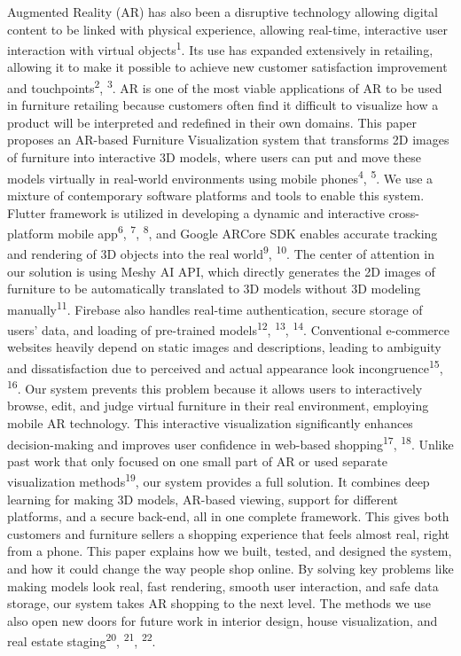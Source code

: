 \documentclass[12pt, a4paper]{article}
\begin{document}
Augmented Reality (AR) has also been a disruptive technology allowing digital content to be linked with physical experience, allowing real-time, interactive user interaction with virtual objects\textsuperscript{1}. Its use has expanded extensively in retailing, allowing it to make it possible to achieve new customer satisfaction improvement and touchpoints\textsuperscript{2}, \textsuperscript{3}. AR is one of the most viable applications of AR to be used in furniture retailing because customers often find it difficult to visualize how a product will be interpreted and redefined in their own domains. This paper proposes an AR-based Furniture Visualization system that transforms 2D images of furniture into interactive 3D models, where users can put and move these models virtually in real-world environments using mobile phones\textsuperscript{4}, \textsuperscript{5}. We use a mixture of contemporary software platforms and tools to enable this system. Flutter framework is utilized in developing a dynamic and interactive cross-platform mobile app\textsuperscript{6}, \textsuperscript{7}, \textsuperscript{8}, and Google ARCore SDK enables accurate tracking and rendering of 3D objects into the real world\textsuperscript{9}, \textsuperscript{10}. The center of attention in our solution is using Meshy AI API, which directly generates the 2D images of furniture to be automatically translated to 3D models without 3D modeling manually\textsuperscript{11}. Firebase also handles real-time authentication, secure storage of users' data, and loading of pre-trained models\textsuperscript{12}, \textsuperscript{13}, \textsuperscript{14}. Conventional e-commerce websites heavily depend on static images and descriptions, leading to ambiguity and dissatisfaction due to perceived and actual appearance look incongruence\textsuperscript{15}, \textsuperscript{16}. Our system prevents this problem because it allows users to interactively browse, edit, and judge virtual furniture in their real environment, employing mobile AR technology. This interactive visualization significantly enhances decision-making and improves user confidence in web-based shopping\textsuperscript{17}, \textsuperscript{18}. Unlike past work that only focused on one small part of AR or used separate visualization methods\textsuperscript{19}, our system provides a full solution. It combines deep learning for making 3D models, AR-based viewing, support for different platforms, and a secure back-end, all in one complete framework. This gives both customers and furniture sellers a shopping experience that feels almost real, right from a phone. This paper explains how we built, tested, and designed the system, and how it could change the way people shop online. By solving key problems like making models look real, fast rendering, smooth user interaction, and safe data storage, our system takes AR shopping to the next level. The methods we use also open new doors for future work in interior design, house visualization, and real estate staging\textsuperscript{20}, \textsuperscript{21}, \textsuperscript{22}.
\end{document}
